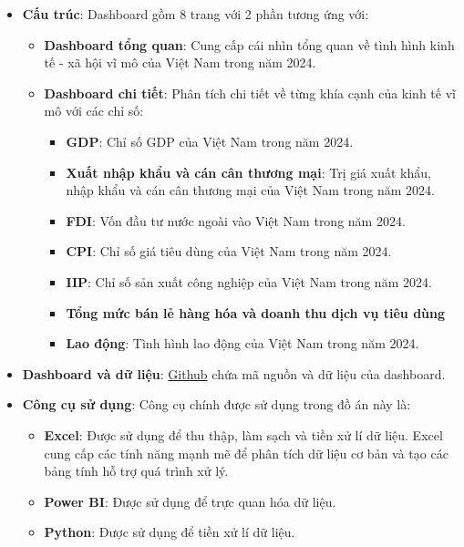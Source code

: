 \documentclass[a4paper]{report}
\begin{document}
{{\begin{itemize}
    \item \textbf{Cấu trúc}: Dashboard gồm 8 trang với 2 phần tương ứng với: 
        \begin{itemize}
            \item \textbf{Dashboard tổng quan}: Cung cấp cái nhìn tổng quan về tình hình kinh tế - xã hội vĩ mô của Việt Nam trong năm 2024.
            \item \textbf{Dashboard chi tiết}: Phân tích chi tiết về từng khía cạnh của kinh tế vĩ mô với các chỉ số:
                \begin{itemize}
                    \item \textbf{GDP}: Chỉ số GDP của Việt Nam trong năm 2024.
                    \item \textbf{Xuất nhập khẩu và cán cân thương mại}: Trị giá xuất khẩu, nhập khẩu và cán cân thương mại của Việt Nam trong năm 2024.
                    \item \textbf{FDI}: Vốn đầu tư nước ngoài vào Việt Nam trong năm 2024.
                    \item \textbf{CPI}: Chỉ số giá tiêu dùng của Việt Nam trong năm 2024.
                    \item \textbf{IIP}: Chỉ số sản xuất công nghiệp của Việt Nam trong năm 2024.
                    \item \textbf{Tổng mức bán lẻ hàng hóa và doanh thu dịch vụ tiêu dùng}
                    \item \textbf{Lao động}: Tình hình lao động của Việt Nam trong năm 2024.
                \end{itemize}
        \end{itemize}
    \item \textbf{Dashboard và dữ liệu}: \href{https://github.com/pililover/-Visualization-Overview-of-Viet-Nam-socio-economic}{Github} chứa mã nguồn và dữ liệu của dashboard.
    \item \textbf{Công cụ sử dụng}: Công cụ chính được sử dụng trong đồ án này là:
        \begin{itemize}
            \item \textbf{Excel}: Được sử dụng để thu thập, làm sạch và tiền xử lí dữ liệu. Excel cung cấp các tính năng mạnh mẽ để phân tích dữ liệu cơ bản và tạo các bảng tính hỗ trợ quá trình xử lý.
            \item \textbf{Power BI}: Được sử dụng để trực quan hóa dữ liệu.
            \item \textbf{Python}: Được sử dụng để tiền xử lí dữ liệu.
        \end{itemize}
\end{itemize}

}}
\end{document}
